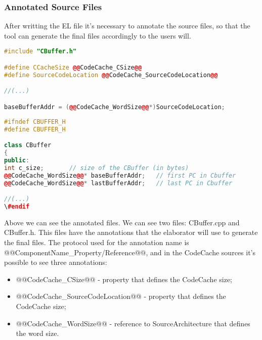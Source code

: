 \subsubsection{Annotated Source Files}
After writting the EL file it's necessary to annotate the source files, so that the tool can generate the final files accordingly to the users will. 
\begin{lstlisting}[caption={Annotations for CBuffer.cpp}, label={lst:annotCBuffer.cpp},language=C++]
#include "CBuffer.h"

#define CCacheSize @@CodeCache_CSize@@
#define SourceCodeLocation @@CodeCache_SourceCodeLocation@@

//(...)

baseBufferAddr = (@@CodeCache_WordSize@@*)SourceCodeLocation;

\end{lstlisting}

\begin{lstlisting}[caption={Annotations for CBuffer.h}, label={lst:annotCBuffer.h},language=C++]
#ifndef CBUFFER_H
#define CBUFFER_H

class CBuffer
{
public:	
int c_size;       // size of the CBuffer (in bytes)
@@CodeCache_WordSize@@* baseBufferAddr;   // first PC in Cbuffer
@@CodeCache_WordSize@@* lastBufferAddr;   // last PC in Cbuffer

//(...)
\#endif
\end{lstlisting}

Above we can see the annotated files. We can see two files: CBuffer.cpp and CBuffer.h. This files have the annotations that the elaborator will use to generate the final files. The protocol used for the annotation name is @@ComponentName\_Property/Reference@@, and in the CodeCache sources it's possible to see three annotations:
\begin{itemize}
	\item @@CodeCache\_CSize@@ - property that defines the CodeCache size;
	\item @@CodeCache\_SourceCodeLocation@@ - property that defines the CodeCache size;
	\item @@CodeCache\_WordSize@@ - reference to SourceArchitecture that defines the word size.	
\end{itemize}





			
